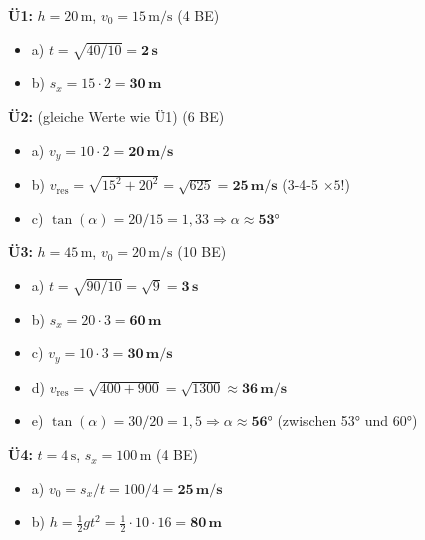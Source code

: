 \documentclass[10pt, a4paper]{article}
\begin{document}
\vspace{4pt}

\begin{loesungbox}
\small
\textbf{Ü1:} $h = 20\,\text{m}$, $v_0 = 15\,\text{m/s}$ \hfill (4 BE)
\begin{itemize}[nosep]
    \item a) $t = \sqrt{40/10} = \mathbf{2\,\text{s}}$
    \item b) $s_x = 15 \cdot 2 = \mathbf{30\,\text{m}}$
\end{itemize}

\vspace{4pt}
\textbf{Ü2:} (gleiche Werte wie Ü1) \hfill (6 BE)
\begin{itemize}[nosep]
    \item a) $v_y = 10 \cdot 2 = \mathbf{20\,\text{m/s}}$
    \item b) $v_{\text{res}} = \sqrt{15^2 + 20^2} = \sqrt{625} = \mathbf{25\,\text{m/s}}$ \quad (3-4-5 $\times 5$!)
    \item c) $\tan(\alpha) = 20/15 = 1{,}33 \Rightarrow \alpha \approx \mathbf{53°}$
\end{itemize}

\vspace{4pt}
\textbf{Ü3:} $h = 45\,\text{m}$, $v_0 = 20\,\text{m/s}$ \hfill (10 BE)
\begin{itemize}[nosep]
    \item a) $t = \sqrt{90/10} = \sqrt{9} = \mathbf{3\,\text{s}}$
    \item b) $s_x = 20 \cdot 3 = \mathbf{60\,\text{m}}$
    \item c) $v_y = 10 \cdot 3 = \mathbf{30\,\text{m/s}}$
    \item d) $v_{\text{res}} = \sqrt{400 + 900} = \sqrt{1300} \approx \mathbf{36\,\text{m/s}}$
    \item e) $\tan(\alpha) = 30/20 = 1{,}5 \Rightarrow \alpha \approx \mathbf{56°}$ (zwischen 53° und 60°)
\end{itemize}

\vspace{4pt}
\textbf{Ü4:} $t = 4\,\text{s}$, $s_x = 100\,\text{m}$ \hfill (4 BE)
\begin{itemize}[nosep]
    \item a) $v_0 = s_x / t = 100/4 = \mathbf{25\,\text{m/s}}$
    \item b) $h = \frac{1}{2} g t^2 = \frac{1}{2} \cdot 10 \cdot 16 = \mathbf{80\,\text{m}}$
\end{itemize}
\end{loesungbox}
\end{document}
